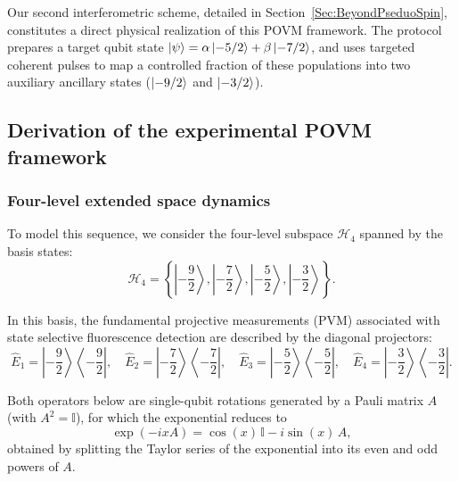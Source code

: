 Our second interferometric scheme, detailed in Section~\ref{Sec:BeyondPseduoSpin}, constitutes a direct physical realization of this POVM framework. The protocol prepares a target qubit state $\ket{\psi} = \alpha \ket{-5/2} + \beta \ket{-7/2}$, and uses targeted coherent pulses to map a controlled fraction of these populations into two auxiliary ancillary states ($\ket{-9/2}$ and $\ket{-3/2}$).

\subsection{Derivation of the experimental POVM framework}

\subsubsection{Four-level extended space dynamics}

To model this sequence, we consider the four-level subspace $\mathcal{H}_4$ spanned by the basis states:
\begin{equation}
    \mathcal{H}_4 = \left\{ \left|-\frac{9}{2}\right\rangle, \left|-\frac{7}{2}\right\rangle, \left|-\frac{5}{2}\right\rangle, \left|-\frac{3}{2}\right\rangle \right\}.
\end{equation}


In this basis, the fundamental projective measurements (PVM) associated with state selective fluorescence detection are described by the diagonal projectors:
\begin{equation}
    \hat{E}_1 = \left|-\frac{9}{2}\right\rangle\left\langle -\frac{9}{2}\right|, \quad 
    \hat{E}_2 = \left|-\frac{7}{2}\right\rangle\left\langle -\frac{7}{2}\right|, \quad 
    \hat{E}_3 = \left|-\frac{5}{2}\right\rangle\left\langle -\frac{5}{2}\right|, \quad 
    \hat{E}_4 = \left|-\frac{3}{2}\right\rangle\left\langle -\frac{3}{2}\right|.
\end{equation}

Both operators below are single-qubit rotations generated by a Pauli matrix $A$ (with $A^2=\mathbb{I}$), for which the exponential reduces to
\begin{equation}
    \exp(-ixA) = \cos(x)\,\mathbb{I} - i\sin(x)\,A, \label{eq:pauli-exp}
\end{equation}
obtained by splitting the Taylor series of the exponential into its even and odd powers of $A$.

